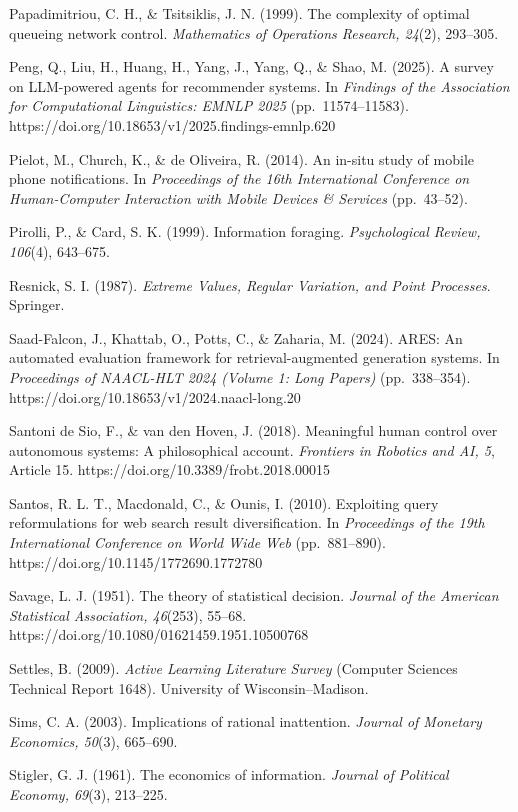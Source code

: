 \documentclass[
  11pt]{article}
\begin{document}
Papadimitriou, C. H., \& Tsitsiklis, J. N. (1999). The complexity of
optimal queueing network control. \emph{Mathematics of Operations
Research, 24}(2), 293--305.

Peng, Q., Liu, H., Huang, H., Yang, J., Yang, Q., \& Shao, M. (2025). A
survey on LLM-powered agents for recommender systems. In \emph{Findings
of the Association for Computational Linguistics: EMNLP 2025}
(pp.~11574--11583). https://doi.org/10.18653/v1/2025.findings-emnlp.620

Pielot, M., Church, K., \& de Oliveira, R. (2014). An in-situ study of
mobile phone notifications. In \emph{Proceedings of the 16th
International Conference on Human-Computer Interaction with Mobile
Devices \& Services} (pp.~43--52).

Pirolli, P., \& Card, S. K. (1999). Information foraging.
\emph{Psychological Review, 106}(4), 643--675.

Resnick, S. I. (1987). \emph{Extreme Values, Regular Variation, and
Point Processes}. Springer.

Saad-Falcon, J., Khattab, O., Potts, C., \& Zaharia, M. (2024). ARES: An
automated evaluation framework for retrieval-augmented generation
systems. In \emph{Proceedings of NAACL-HLT 2024 (Volume 1: Long Papers)}
(pp.~338--354). https://doi.org/10.18653/v1/2024.naacl-long.20

Santoni de Sio, F., \& van den Hoven, J. (2018). Meaningful human
control over autonomous systems: A philosophical account.
\emph{Frontiers in Robotics and AI, 5}, Article 15.
https://doi.org/10.3389/frobt.2018.00015

Santos, R. L. T., Macdonald, C., \& Ounis, I. (2010). Exploiting query
reformulations for web search result diversification. In
\emph{Proceedings of the 19th International Conference on World Wide
Web} (pp.~881--890). https://doi.org/10.1145/1772690.1772780

Savage, L. J. (1951). The theory of statistical decision. \emph{Journal
of the American Statistical Association, 46}(253), 55--68.
https://doi.org/10.1080/01621459.1951.10500768

Settles, B. (2009). \emph{Active Learning Literature Survey} (Computer
Sciences Technical Report 1648). University of Wisconsin--Madison.

Sims, C. A. (2003). Implications of rational inattention. \emph{Journal
of Monetary Economics, 50}(3), 665--690.

Stigler, G. J. (1961). The economics of information. \emph{Journal of
Political Economy, 69}(3), 213--225.
\end{document}
